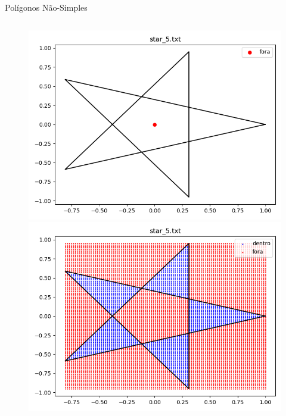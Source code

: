 \documentclass[aspectratio=169]{beamer}
\begin{document}
\begin{frame}{Polígonos Não-Simples}
\begin{columns}
    \begin{center}
      \begin{figure}
        \begin{overprint}
        \includegraphics[width=1.0\textwidth]{figures/star_5.png}
        \includegraphics[width=1.0\textwidth]{figures/star_5_grid.png}
        \end{overprint}
      \end{figure}
    \end{center}
  \end{columns}

\end{frame}
\end{document}
